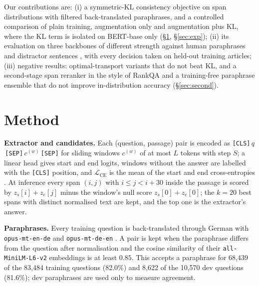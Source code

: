 \documentclass[11pt]{article}
\begin{document}
Our contributions are: (i) a symmetric-KL consistency objective on span distributions with filtered back-translated paraphrases, and a controlled comparison of plain training, augmentation only and augmentation plus KL, where the KL term is isolated on BERT-base only (\S\ref{sec:method}, \S\ref{sec:exp}); (ii) its evaluation on three backbones of different strength against human paraphrases \citep{gan2019improving} and distractor sentences \citep{jia2017adversarial}, with every decision taken on held-out training articles; (iii) negative results: optimal-transport variants \citep{peyre2019computational,kuhn1955hungarian} that do not beat KL, and a second-stage span reranker in the style of RankQA \citep{kratzwald2019rankqa} and a training-free paraphrase ensemble that do not improve in-distribution accuracy (\S\ref{sec:second}).

\section{Method}
\label{sec:method}
\textbf{Extractor and candidates.} Each (question, passage) pair is encoded as \texttt{[CLS]}\,$q$\,\texttt{[SEP]}\,$c^{(w)}$\,\texttt{[SEP]} for sliding windows $c^{(w)}$ of at most $L$ tokens with step $S$; a linear head gives start and end logits, windows without the answer are labelled with the \texttt{[CLS]} position, and $\mathcal{L}_{\mathrm{CE}}$ is the mean of the start and end cross-entropies \citep{devlin2019bert}. At inference every span $(i,j)$ with $i\le j<i+30$ inside the passage is scored by $z_s[i]+z_e[j]$ minus the window's null score $z_s[0]+z_e[0]$; the $k=20$ best spans with distinct normalised text are kept, and the top one is the extractor's answer.

\textbf{Paraphrases.} Every training question is back-translated through German with \texttt{opus-mt-en-de} and \texttt{opus-mt-de-en} \citep{tiedemann2020opus}. A pair is kept when the paraphrase differs from the question after normalisation and the cosine similarity of their \texttt{all-MiniLM-L6-v2} embeddings \citep{reimers2019sentence} is at least $0.85$. This accepts a paraphrase for 68,439 of the 83,484 training questions (82.0\%) and 8,622 of the 10,570 dev questions (81.6\%); dev paraphrases are used only to measure agreement.
\end{document}
